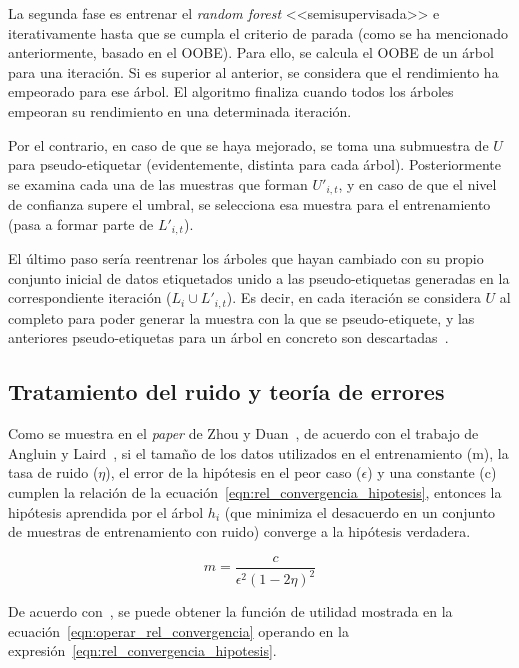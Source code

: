 \begin{itemize}
La segunda fase es entrenar el \textit{random forest} <<semisupervisada>> e iterativamente hasta que se cumpla el criterio de parada (como se ha mencionado anteriormente, basado en el OOBE). Para ello, se calcula el OOBE de un árbol para una iteración. Si es superior al anterior, se considera que el rendimiento ha empeorado para ese árbol. El algoritmo finaliza cuando todos los árboles empeoran su rendimiento en una determinada iteración.

Por el contrario, en caso de que se haya mejorado, se toma una submuestra de $U$ para pseudo-etiquetar (evidentemente, distinta para cada árbol). Posteriormente se examina cada una de las muestras que forman $U'_{i, t}$, y en caso de que el nivel de confianza supere el umbral, se selecciona esa muestra para el entrenamiento (pasa a formar parte de $L'_{i, t}$).

El último paso sería reentrenar los árboles que hayan cambiado con su propio conjunto inicial de datos etiquetados unido a las pseudo-etiquetas generadas en la correspondiente iteración ($L_{i}\cup L'_{i,t}$). Es decir, en cada iteración se considera $U$ al completo para poder generar la muestra con la que se pseudo-etiquete, y las anteriores pseudo-etiquetas para un árbol en concreto son descartadas~\cite{engelen2018thesis}.


\end{itemize} 

\subsection{Tratamiento del ruido y teoría de errores}

Como se muestra en el \textit{paper} de Zhou y Duan~\cite{zhou2021SemisupervisedRecommendationAttack}, de acuerdo con el trabajo de Angluin y Laird~\cite{noisyExamplesCoforest1988Dana}, si el tamaño de los datos utilizados en el entrenamiento (m), la tasa de ruido ($\eta$), el error de la hipótesis en el peor caso ($\epsilon$) y una constante (c) cumplen la relación de la ecuación~\ref{eqn:rel_convergencia_hipotesis}, entonces la hipótesis aprendida por el árbol $h_{i}$ (que minimiza el desacuerdo en un conjunto de muestras de entrenamiento con ruido) converge a la hipótesis verdadera.

\begin{equation}\label{eqn:rel_convergencia_hipotesis} m = \frac{c}{\epsilon^{2}(1-2\eta)^{2}} \end{equation} 

De acuerdo con~\cite{zhou2021SemisupervisedRecommendationAttack}, se puede obtener la función de utilidad mostrada en la ecuación~\ref{eqn:operar_rel_convergencia} operando en la expresión~\ref{eqn:rel_convergencia_hipotesis}.

